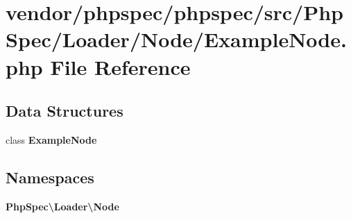 \section{vendor/phpspec/phpspec/src/\+Php\+Spec/\+Loader/\+Node/\+Example\+Node.php File Reference}
\label{_example_node_8php}
\subsection*{Data Structures}
\begin{DoxyCompactItemize}
\item 
class {\bf Example\+Node}
\end{DoxyCompactItemize}
\subsection*{Namespaces}
\begin{DoxyCompactItemize}
\item 
 {\bf Php\+Spec\textbackslash{}\+Loader\textbackslash{}\+Node}
\end{DoxyCompactItemize}
